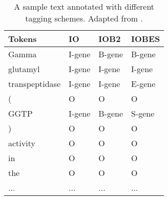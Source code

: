 \begingroup

\begin{table}[!t]

\caption[A sample text annotated with different tagging schemes.]{A sample text annotated with different tagging schemes. Adapted from \textcite{cho2013a}.}
\label{tab:tagging-schemes-example}

\centering

\begin{tabular}{llll}

\toprule

Tokens & IO & IOB2 & IOBES\\

\midrule

Gamma & I-gene & B-gene & B-gene\\

glutamyl & I-gene & I-gene & I-gene\\

transpeptidase & I-gene & I-gene & E-gene\\

( & O & O & O\\

GGTP & I-gene & B-gene & S-gene\\

) & O & O & O\\

activity & O & O & O\\

in & O & O & O\\

the & O & O & O\\

... & ... & ... & ...\\

\bottomrule

\end{tabular}
\end{table}
\endgroup
